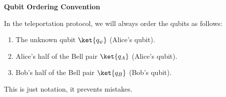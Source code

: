 \highspace
\begin{flushleft}
    \textcolor{Green3}{ \textbf{Qubit Ordering Convention}}
\end{flushleft}
In the teleportation protocol, we will always order the qubits as follows:
\begin{enumerate}
    \item The unknown qubit $\ket{q_{\psi}}$ (Alice's qubit).
    \item Alice's half of the Bell pair $\ket{q_A}$ (Alice's qubit).
    \item Bob's half of the Bell pair $\ket{q_B}$ (Bob's qubit).
\end{enumerate}
This is just notation, it prevents mistakes.